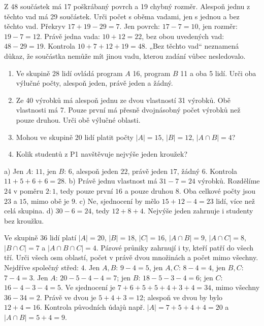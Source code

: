 \documentclass[11pt,a4paper]{article}
\begin{document}
\begin{prikladReseniBox}[title={P2: hledáme překryv},breakable=false]
Z 48 součástek má 17 poškrábaný povrch a 19 chybný rozměr.
Alespoň jednu z těchto vad má 29 součástek. Urči počet s oběma vadami,
jen s jednou a bez těchto vad.
\tcblower
Překryv $17+19-29=7$. Jen povrch: $17-7=10$, jen rozměr: $19-7=12$.
Právě jedna vada: $10+12=22$, bez obou uvedených vad: $48-29=19$.
Kontrola $10+7+12+19=48$. „Bez těchto vad“ neznamená důkaz, že součástka
nemůže mít jinou vadu, kterou zadání vůbec nesledovalo.
\end{prikladReseniBox}

\begin{zadaniReseniBox}[title={S1: nejprve náčrt a význam údajů},breakable=false]
\begin{enumerate}[label=\alph*)]
\item Ve skupině 28 lidí ovládá program $A$ 16, program $B$ 11 a oba 5 lidí.
Urči oba výlučné počty, alespoň jeden, právě jeden a žádný.
\item Ze 40 výrobků má alespoň jednu ze dvou vlastností 31 výrobků.
Obě vlastnosti má 7. Pouze první má přesně dvojnásobný počet výrobků
než pouze druhou. Urči obě výlučné oblasti.
\item Mohou ve skupině 20 lidí platit počty $|A|=15$, $|B|=12$, $|A\cap B|=4$?
\item Kolik studentů z P1 navštěvuje nejvýše jeden kroužek?
\end{enumerate}
\tcblower
a) Jen $A$: $11$, jen $B$: $6$, alespoň jeden $22$, právě jeden $17$,
žádný $6$. Kontrola $11+5+6+6=28$.
b) Právě jednu vlastnost má $31-7=24$ výrobků.
Rozdělíme $24$ v poměru $2:1$, tedy pouze první $16$ a pouze druhou $8$.
Oba celkové počty jsou $23$ a $15$, mimo obě je $9$.
c) Ne, sjednocení by mělo $15+12-4=23$ lidí, více než celá skupina.
d) $30-6=24$, tedy $12+8+4$. Nejvýše jeden zahrnuje i studenty bez kroužku.
\end{zadaniReseniBox}

\begin{zadaniReseniBox}[title={R1: postupuj od společného středu, 15–20 minut}]
Ve skupině 36 lidí platí $|A|=20$, $|B|=18$, $|C|=16$,
$|A\cap B|=9$, $|A\cap C|=8$, $|B\cap C|=7$ a $|A\cap B\cap C|=4$.
Párové průniky zahrnují i ty, kteří patří do všech tří.
Urči všech osm oblastí, počet v právě dvou množinách a počet mimo všechny.
\tcblower
Nejdříve společný střed: $4$.
Jen $A,B$: $9-4=5$, jen $A,C$: $8-4=4$, jen $B,C$: $7-4=3$.
Jen $A$: $20-5-4-4=7$; jen $B$: $18-5-3-4=6$;
jen $C$: $16-4-3-4=5$.
Ve sjednocení je $7+6+5+5+4+3+4=34$, mimo všechny $36-34=2$.
Právě ve dvou je $5+4+3=12$; alespoň ve dvou by bylo $12+4=16$.
Kontrola původních údajů např. $|A|=7+5+4+4=20$ a $|A\cap B|=5+4=9$.
\end{zadaniReseniBox}
\end{document}
